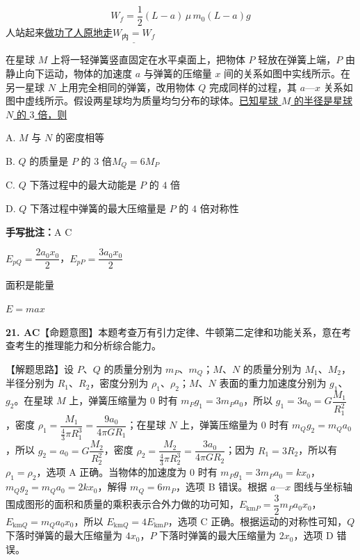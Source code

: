 \[ W_f=\frac{1}{2}(L-a)\,\mu\, m_0 (L-a) g \]
人站起来\underline{做功了}\quad \underline{人原地走}\quad $\underline{W_{\text{内}}=W_f}$
\begin{problem}[剪贴印刷题]
在星球 $M$ 上将一轻弹簧竖直固定在水平桌面上，把物体 $P$ 轻放在弹簧上端，$P$ 由静止向下运动，物体的加速度 $a$ 与弹簧的压缩量 $x$ 间的关系如图中实线所示。在另一星球 $N$ 上用完全相同的弹簧，改用物体 $Q$ 完成同样的过程，其 $a$—$x$ 关系如图中虚线所示。假设两星球均为质量均匀分布的球体。\underline{已知星球 $M$ 的半径是星球 $N$ 的 $3$ 倍，则}%

A. $M$ 与 $N$ 的密度相等

B. $Q$ 的质量是 $P$ 的 $3$ 倍\quad $M_Q=6M_P$%

C. $Q$ 下落过程中的最大动能是 $P$ 的 $4$ 倍

D. $Q$ 下落过程中弹簧的最大压缩量是 $P$ 的 $4$ 倍\quad 对称性 \unclear{$\checkmark$}%

\textbf{手写批注：}A\,\,C%

$E_{pQ}=\dfrac{2a_0x_0}{2}$，\quad $E_{pP}=\dfrac{3a_0x_0}{2}$%

面积是能量

$E=max$

\begin{solution}
\textbf{21. AC}\quad 【命题意图】本题考查万有引力定律、牛顿第二定律和功能关系，意在考查考生的推理能力和分析综合能力。

【解题思路】设 $P$、$Q$ 的质量分别为 $m_P$、$m_Q$；$M$、$N$ 的质量分别为 $M_1$、$M_2$，半径分别为 $R_1$、$R_2$，密度分别为 $\rho_1$、$\rho_2$；$M$、$N$ 表面的重力加速度分别为 $g_1$、$g_2$。在星球 $M$ 上，弹簧压缩量为 $0$ 时有 $m_Pg_1=3m_Pa_0$，所以 $g_1=3a_0=G\dfrac{M_1}{R_1^2}$，密度 $\rho_1=\dfrac{M_1}{\frac{4}{3}\pi R_1^3}=\dfrac{9a_0}{4\pi GR_1}$；在星球 $N$ 上，弹簧压缩量为 $0$ 时有 $m_Qg_2=m_Qa_0$，所以 $g_2=a_0=G\dfrac{M_2}{R_2^2}$，密度 $\rho_2=\dfrac{M_2}{\frac{4}{3}\pi R_2^3}=\dfrac{3a_0}{4\pi GR_2}$；因为 $R_1=3R_2$，所以有 $\rho_1=\rho_2$，选项 A 正确。当物体的加速度为 $0$ 时有 $m_Pg_1=3m_Pa_0=kx_0$，$m_Qg_2=m_Qa_0=2kx_0$，解得 $m_Q=6m_P$，选项 B 错误。根据 $a$—$x$ 图线与坐标轴围成图形的面积和质量的乘积表示合外力做的功可知，$E_{\mathrm{km}P}=\dfrac{3}{2}m_Pa_0x_0$，$E_{\mathrm{km}Q}=m_Qa_0x_0$，所以 $E_{\mathrm{km}Q}=4E_{\mathrm{km}P}$，选项 C 正确。根据运动的对称性可知，$Q$ 下落时弹簧的最大压缩量为 $4x_0$，$P$ 下落时弹簧的最大压缩量为 $2x_0$，选项 D 错误。
\end{solution}
\end{problem}
